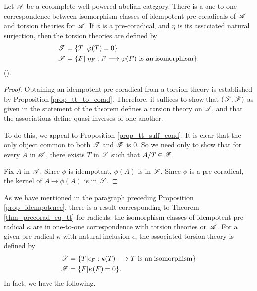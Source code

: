 \begin{thm}\label{thm_precorad_eq_tt}
Let $\mathscr{A}$ be a cocomplete well-powered abelian category.
There is a one-to-one correspondence between isomorphism 
classes of idempotent pre-coradicals of $\mathscr{A}$ and torsion theories for
$\mathscr{A}$. If $\phi$ is a pre-coradical, and $\eta$ is its 
associated natural surjection, then the torsion theories are 
defined by
\begin{align*}
\mathscr{T} &= \{ T |\; \varphi(T) = 0 \} \\
\mathscr{F} &= \{ F |\; \eta_F: F \longrightarrow \varphi(F)
                  \textrm{ is an isomorphism}\}.
\end{align*}
(\CF \cite[I2.9]{BJV}).
\end{thm}
\begin{proof}
Obtaining an idempotent pre-coradical from a torsion theory is
established by Proposition \ref{prop_tt_to_corad}. Therefore, it suffices
to show that $(\mathscr{T}, \mathscr{F})$ as given in the statement of the
theorem defines a torsion theory on $\mathscr{A}$, and that the associations
define quasi-inverses of one another.

To do this, we appeal to Proposition \ref{prop_tt_suff_cond}. It is 
clear that the only object common to both $\mathscr{T}$
and $\mathscr{F}$ is $0$. So we need only to show that for every $A$ 
in $\mathscr{A}$, there exists $T$ in $\mathscr{T}$ such that $A/T \in 
\mathscr{F}$.

Fix $A$ in $\mathscr{A}$. Since $\phi$ is idempotent, $\phi(A)$ is 
in $\mathscr{F}$. Since $\phi$ is a pre-coradical, the kernel of $A
\to \phi(A)$ is in $\mathscr{T}$.
\end{proof}

As we have mentioned in the paragraph preceding Proposition
\ref{prop_idempotence}, there is a result corresponding to Theorem 
\ref{thm_precorad_eq_tt} for radicals: the isomorphism classes of 
idempotent pre-radical $\kappa$ are in one-to-one correspondence 
with torsion theories on $\mathscr{A}$. For a given pre-radical 
$\kappa$ with natural inclusion $\epsilon$, the associated torsion 
theory is defined by 
\begin{align*}
\mathscr{T} &= \{ T | \epsilon_F: \kappa(T) \longrightarrow T 
                  \textrm{ is an isomorphism}\} \\
\mathscr{F} &= \{ F | \kappa(F) = 0 \}.
\end{align*}
In fact, we have the following.

